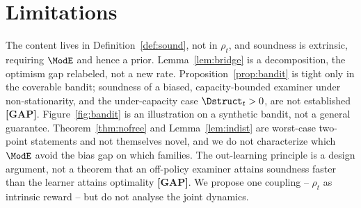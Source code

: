 
\section{Limitations}
\label{sec:limits}

The content lives in Definition~\ref{def:sound}, not in $\rho_t$, and soundness is extrinsic, requiring $\ModE$ and hence a prior. Lemma~\ref{lem:bridge} is a decomposition, the optimism gap relabeled, not a new rate. Proposition~\ref{prop:bandit} is tight only in the coverable bandit; soundness of a biased, capacity-bounded examiner under non-stationarity, and the under-capacity case $\Dstruct_t>0$, are not established \textbf{[GAP]}. Figure~\ref{fig:bandit} is an illustration on a synthetic bandit, not a general guarantee. Theorem~\ref{thm:nofree} and Lemma~\ref{lem:indist} are worst-case two-point statements and not themselves novel, and we do not characterize which $\ModE$ avoid the bias gap on which families. The out-learning principle is a design argument, not a theorem that an off-policy examiner attains soundness faster than the learner attains optimality \textbf{[GAP]}. We propose one coupling -- $\rho_t$ as intrinsic reward -- but do not analyse the joint dynamics.
